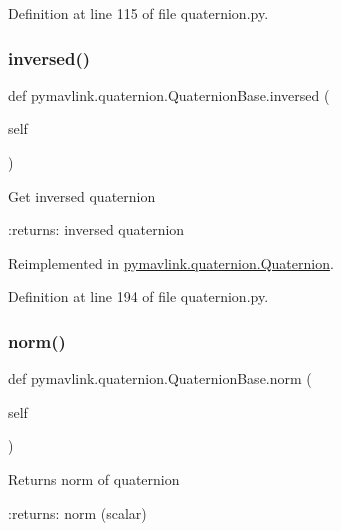 Definition at line 115 of file quaternion.\+py.

\mbox{\label{classpymavlink_1_1quaternion_1_1QuaternionBase_a6d4db8c4ecf5f04d0ebaf798d17605cf}} 
\subsubsection{\texorpdfstring{inversed()}{inversed()}}
{\footnotesize\ttfamily def pymavlink.\+quaternion.\+Quaternion\+Base.\+inversed (\begin{DoxyParamCaption}\item[{}]{self }\end{DoxyParamCaption})}

\begin{DoxyVerb}Get inversed quaternion

:returns: inversed quaternion
\end{DoxyVerb}
 

Reimplemented in \mbox{\hyperlink{classpymavlink_1_1quaternion_1_1Quaternion_a0dd030159c7d726fad2cb12fd4c3983a}{pymavlink.\+quaternion.\+Quaternion}}.



Definition at line 194 of file quaternion.\+py.

\mbox{\label{classpymavlink_1_1quaternion_1_1QuaternionBase_a9b204e22c7e9e0625a84ef16d8b87755}} 
\subsubsection{\texorpdfstring{norm()}{norm()}}
{\footnotesize\ttfamily def pymavlink.\+quaternion.\+Quaternion\+Base.\+norm (\begin{DoxyParamCaption}\item[{}]{self }\end{DoxyParamCaption})}

\begin{DoxyVerb}Returns norm of quaternion

:returns: norm (scalar)
\end{DoxyVerb}
 

